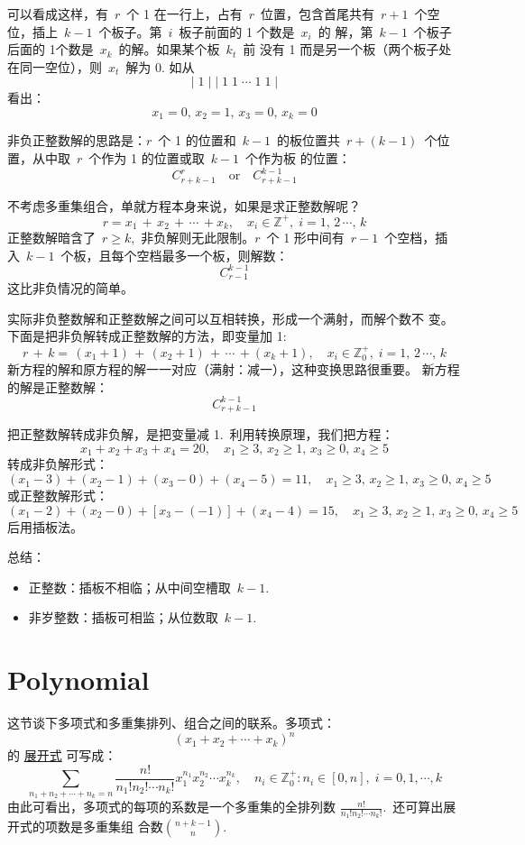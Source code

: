 可以看成这样，有~$r$~个 1 在一行上，占有~$r$~位置，包含首尾共有~$r +
1$~个空位，插上~$k - 1$~个板子。第~$i$~板子前面的 1 个数是~$x_i$~的
解，第~$k - 1$~个板子后面的 1个数是~$x_k$~的解。如果某个板~$k_t$~前
没有 1 而是另一个板（两个板子处在同一空位），则~$x_t$~解为 0. 如从
\[ |\; 1\; |\; |\; 1\; 1\; \cdots\; 1\; 1\; | \] 
看出：
\[ x_1 = 0,\, x_2 = 1,\, x_3 = 0,\, x_k = 0 \]

非负正整数解的思路是：$r$~个 1 的位置和~$k - 1$~的板位置共~$r
+ (k - 1)$~个位置，从中取~$r$~个作为 1 的位置或取~$k - 1$~个作为板
的位置：
\[ C_{r + k - 1}^r \quad \text{or} \quad C_{r + k - 1}^{k - 1} \]

不考虑多重集组合，单就方程本身来说，如果是求正整数解呢？
\[ r = x_1\, +\, x_2\, +\, \cdots\, + x_k,\quad x_i \in
  \mathbb{Z}^+,\; i = 1,\, 2\, \cdots,\, k \]
正整数解暗含了~$r \geq k$,~非负解则无此限制。$r$~个 1 形中间有~$r
- 1$~个空档，插入~$k - 1$~个板，且每个空档最多一个板，则解数：
\[ C_{r - 1}^{k - 1} \]
这比非负情况的简单。

实际非负整数解和正整数解之间可以互相转换，形成一个满射，而解个数不
变。下面是把非负解转成正整数解的方法，即变量加 1:
\[ r\, +\, k =\, (x_1 + 1)\, +\, (x_2 + 1)\, +\, \cdots\, + (x_k + 1),\quad
  x_i \in \mathbb{Z}_0^+,\; i = 1,\, 2\, \cdots,\, k \]
新方程的解和原方程的解一一对应（满射：减一），这种变换思路很重要。
新方程的解是正整数解：
\[ C_{r + k - 1}^{k - 1} \]

把正整数解转成非负解，是把变量减 1.~利用转换原理，我们把方程：
\[ x_1 + x_2 + x_3 + x_4 = 20,\quad x_1 \geq 3,\, x_2 \geq 1,\,
  x_3 \geq 0,\, x_4 \geq 5 \]
转成非负解形式：
\[ (x_1 - 3) + (x_2 - 1) + (x_3 - 0) + (x_4 - 5) = 11,\quad x_1
  \geq 3,\, x_2 \geq 1,\, x_3 \geq 0,\, x_4 \geq 5 \]
或正整数解形式：
\[ (x_1 - 2) + (x_2 - 0) + [x_3 - (-1)] + (x_4 - 4) = 15,\quad x_1
  \geq 3,\, x_2 \geq 1,\, x_3 \geq 0,\, x_4 \geq 5 \]
后用插板法。

总结：

\begin{itemize}
\item 正整数：插板不相临；从中间空槽取~$k - 1$.
\item 非岁整数：插板可相监；从位数取~$k - 1$.
\end{itemize}

\section{Polynomial}
\label{sec:Polynomial}

这节谈下多项式和多重集排列、组合之间的联系。多项式：
\[ (x_1 + x_2 + \cdots + x_k)^n \]
的
\href{https://zh.wikipedia.org/zh-hans/\%E4\%BA\%8C\%E9\%A1\%B9\%E5\%BC\%8F\%E5\%AE\%9A\%E7\%90\%86#\%E5\%A4\%9A\%E9\%A1\%B9\%E5\%BC\%8F\%E5\%B1\%95\%E5\%BC\%80}{
  展开式}
可写成：
\[ \sum_{n_1 + n_2 + \cdots + n_k = n}\frac{n!}{n_1! n_2! \cdots
    n_k!}  x_1^{n_1} x_2^{n_2} \cdots x_k^{n_k},\quad n_i \in
  \mathbb{Z}_0^+: n_i \in [0,n],\; i = 0,1,\cdots,k \]
由此可看出，多项式的每项的系数是一个多重集的全排列数
$\frac{n!}{n_1! n_2! \cdots n_k!}$.~还可算出展开式的项数是多重集组
合数$\binom{n + k - 1}{n}$.

